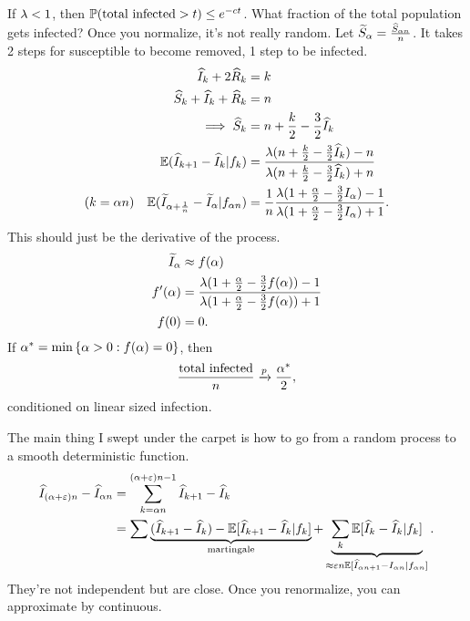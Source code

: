 If $\lambda<1$, then $\mathbb{P}(\text{total infected}>t)\le e^{-ct}$. %
What fraction of the total population gets infected? Once you normalize, it's not really random.
Let $\widetilde{S}_\alpha = \frac{\widehat{S}_{\alpha n}}{n}$.
It takes 2 steps for susceptible to become removed, 1 step to be infected.
\begin{align}
\widehat{I}_k + 2\widehat{R}_k &=k\\
\widehat{S}_k + \widehat{I}_k + \widehat{R}_k &=n\\
\implies \widehat{S}_k &= n + \frac{k}{2} - \frac{3}{2} \widehat{I}_k\\
\mathbb{E} (\widehat{I}_{k+1} - \widehat{I}_k|f_k)
&=\frac{\lambda(n+\frac{k}{2} - \frac{3}{2} \widehat{I}_k) - n}{\lambda(n+\frac{k}{2} - \frac{3}{2} \widehat{I}_k) + n}\\
(k=\alpha n)\quad
\mathbb{E} (\widetilde{I}_{\alpha+\frac{1}{n}} - \widetilde{I}_\alpha | f_{\alpha n})
&=\frac{1}{n} \frac{\lambda (1+\frac{\alpha}{2} - \frac{3}{2} I_\alpha)-1}{\lambda (1+\frac{\alpha}{2} - \frac{3}{2} I_\alpha)+1}.
\end{align}
This should just be the derivative of the process.
\begin{align}
\widetilde{I}_\alpha &\approx f(\alpha)\\
f'(\alpha) &= \frac{\lambda (1+\frac{\alpha}{2} - \frac{3}{2} f(\alpha))-1}{\lambda (1+\frac{\alpha}{2} - \frac{3}{2} f(\alpha))+1}\\
f(0)&=0.
\end{align}
If $\alpha^*=\min\left\{{\alpha>0}:{f(\alpha)=0}\right\}$, 
then 
\begin{align}
\frac{\text{total infected}}{n} \xrightarrow{p} \frac{\alpha^*}{2},
\end{align}
conditioned on linear sized infection.

The main thing I swept under the carpet is how to go from a random process to a smooth deterministic function.
\begin{align}
\widehat{I}_{(\alpha+\varepsilon)n} - \widehat{I}_{\alpha n}
&= \sum_{k=\alpha n}^{(\alpha+\varepsilon)n-1} 
\widehat{I}_{k+1}-\widehat{I}_k \\
&=\sum\underbrace{(\widehat{I}_{k+1} - \widehat{I}_k)
 - \mathbb{E}[\widehat{I}_{k+1} - \widehat{I}_k|f_k]}_{\text{martingale}} + \underbrace{\sum_k \mathbb{E} [\widehat{I}_k - \widehat{I}_k |f_k]}_{\approx \varepsilon n \mathbb{E}[\widehat{I}_{\alpha n+1}-I_{\alpha n}|f_{\alpha n}]}.
\end{align}
They're not independent but are close. Once you renormalize, you can approximate by continuous.